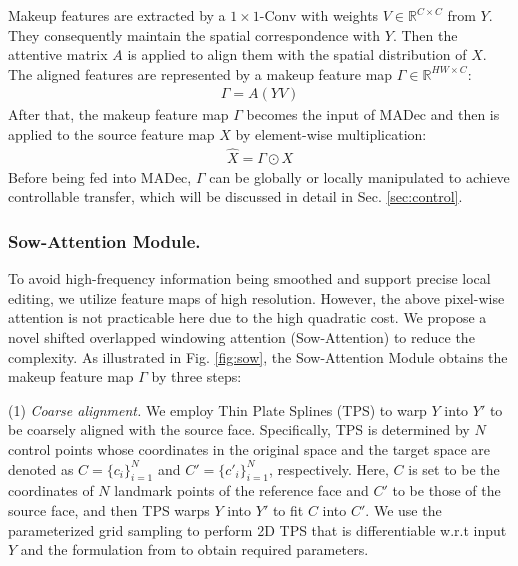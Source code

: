 Makeup features are extracted by a $1\times1$-Conv with weights $V\in\mathbb{R}^{C\times C}$ from $Y$. They consequently maintain the spatial correspondence with $Y$. Then the attentive matrix $A$ is applied to align them with the spatial distribution of $X$. The aligned features are represented by a makeup feature map $\Gamma\in\mathbb{R}^{HW\times C}$:
\begin{equation}
\begin{aligned}
    \Gamma =A(YV)
\end{aligned}
\end{equation}
After that, the makeup feature map $\Gamma$ becomes the input of MADec and then is applied to the source feature map $X$ by element-wise multiplication: 
\begin{equation}
\begin{aligned}
    \widehat{X} = \Gamma \odot X
\end{aligned}   
\end{equation}
Before being fed into MADec, $\Gamma$ can be globally or locally manipulated to achieve controllable transfer, which will be discussed in detail in Sec. \ref{sec:control}. 
 

\subsubsection{Sow-Attention Module.} 
To avoid high-frequency information being smoothed and support precise local editing, we utilize feature maps of high resolution. However, the above pixel-wise attention is not practicable here due to the high quadratic cost. We propose a novel shifted overlapped windowing attention (Sow-Attention) to reduce the complexity. As illustrated in Fig. \ref{fig:sow}, the Sow-Attention Module obtains the makeup feature map $\Gamma$ by three steps:

(1) \textit{Coarse alignment.} We employ Thin Plate Splines (TPS) to warp  $Y$ into $Y'$ to be coarsely aligned with the source face. Specifically, TPS is determined by $N$ control points whose coordinates in the original space and the target space are denoted as $C = \{c_i\}_{i=1}^N$ and $C' = \{c'_i\}_{i=1}^N$, respectively. Here, $C$ is set to be the coordinates of $N$ landmark points \cite{landmark} of the reference face and $C'$ to be those of the source face, and then TPS warps $Y$ into $Y'$ to fit $C$ into $C'$. We use the parameterized grid sampling \cite{STN} to perform 2D TPS that is differentiable w.r.t input $Y$ and the formulation from \cite{ASTER} to obtain required parameters.

